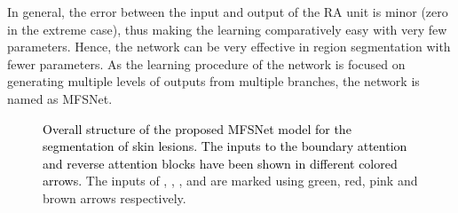 \documentclass[review]{elsarticle}
\begin{document}
In general, the error between the input and output of the RA unit is minor (zero in the extreme case), thus making the learning comparatively easy with very few parameters. Hence, the network can be very effective in region segmentation with fewer parameters. As the learning procedure of the network is focused on generating multiple levels of outputs from multiple branches, the network is named as MFSNet.

\begin{figure*}[tbp]
    \centering
    \caption{\textcolor{black}{Overall structure of the proposed MFSNet model for the segmentation of skin lesions. The inputs to the boundary attention and reverse attention blocks have been shown in different colored arrows.} The inputs of , , , and  are marked using green, red, pink and brown arrows respectively.}
    \label{overall}
\end{figure*}
\end{document}

